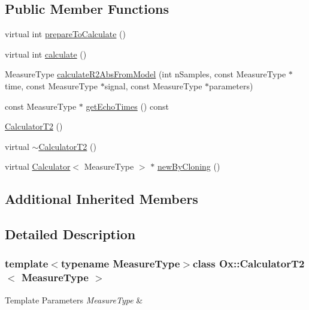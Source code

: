 \subsection*{Public Member Functions}
\begin{DoxyCompactItemize}
\item 
virtual int \hyperlink{class_ox_1_1_calculator_t2_a56e2bcb27465a83dd1a1150b7fe419c8}{prepare\-To\-Calculate} ()
\item 
virtual int \hyperlink{class_ox_1_1_calculator_t2_a8afe4974f3253edea4386a87695607ae}{calculate} ()
\item 
Measure\-Type \hyperlink{class_ox_1_1_calculator_t2_ace5f0515839bdffffb3d60e4536167b6}{calculate\-R2\-Abs\-From\-Model} (int n\-Samples, const Measure\-Type $\ast$time, const Measure\-Type $\ast$signal, const Measure\-Type $\ast$parameters)
\item 
const Measure\-Type $\ast$ \hyperlink{class_ox_1_1_calculator_t2_a1f43cfb6a385e6eeb2ff8fe167ab347d}{get\-Echo\-Times} () const 
\item 
\hyperlink{class_ox_1_1_calculator_t2_a9d0d9d252c322a6db51693ef42c0bed7}{Calculator\-T2} ()
\item 
virtual \hyperlink{class_ox_1_1_calculator_t2_a0a8e02ccb647bb1faf00dbcd4f61124c}{$\sim$\-Calculator\-T2} ()
\item 
virtual \hyperlink{class_ox_1_1_calculator}{Calculator}$<$ Measure\-Type $>$ $\ast$ \hyperlink{class_ox_1_1_calculator_t2_aaec3b1e6254b67b309c9beedb54ad9e7}{new\-By\-Cloning} ()
\end{DoxyCompactItemize}
\subsection*{Additional Inherited Members}


\subsection{Detailed Description}
\subsubsection*{template$<$typename Measure\-Type$>$class Ox\-::\-Calculator\-T2$<$ Measure\-Type $>$}


\begin{DoxyTemplParams}{Template Parameters}
{\em Measure\-Type} & \\
\hline
\end{DoxyTemplParams}


